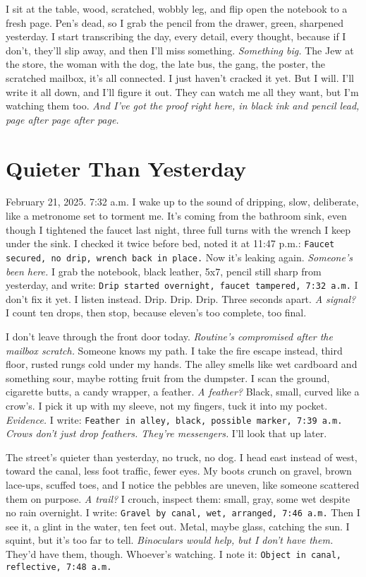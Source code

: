 \documentclass[12pt,oneside]{book} %
\newcommand{\note}[1]{\texttt{#1}}
\begin{document}
I sit at the table, wood, scratched, wobbly leg, and flip open the notebook to a fresh page. Pen’s dead, so I grab the pencil from the drawer, green, sharpened yesterday. I start transcribing the day, every detail, every thought, because if I don’t, they’ll slip away, and then I’ll miss something. \textit{Something big.} The Jew at the store, the woman with the dog, the late bus, the gang, the poster, the scratched mailbox, it’s all connected. I just haven’t cracked it yet. But I will. I’ll write it all down, and I’ll figure it out. They can watch me all they want, but I’m watching them too. \textit{And I’ve got the proof right here, in black ink and pencil lead, page after page after page.}

\chapter{Quieter Than Yesterday}

February 21, 2025. 7:32 a.m. I wake up to the sound of dripping, slow, deliberate, like a metronome set to torment me. It’s coming from the bathroom sink, even though I tightened the faucet last night, three full turns with the wrench I keep under the sink. I checked it twice before bed, noted it at 11:47 p.m.: \note{Faucet secured, no drip, wrench back in place.} Now it’s leaking again. \textit{Someone’s been here.} I grab the notebook, black leather, 5x7, pencil still sharp from yesterday, and write: \note{Drip started overnight, faucet tampered, 7:32 a.m.} I don’t fix it yet. I listen instead. Drip. Drip. Drip. Three seconds apart. \textit{A signal?} I count ten drops, then stop, because eleven’s too complete, too final.

I don’t leave through the front door today. \textit{Routine’s compromised after the mailbox scratch.} Someone knows my path. I take the fire escape instead, third floor, rusted rungs cold under my hands. The alley smells like wet cardboard and something sour, maybe rotting fruit from the dumpster. I scan the ground, cigarette butts, a candy wrapper, a feather. \textit{A feather?} Black, small, curved like a crow’s. I pick it up with my sleeve, not my fingers, tuck it into my pocket. \textit{Evidence.} I write: \note{Feather in alley, black, possible marker, 7:39 a.m.} \textit{Crows don’t just drop feathers. They’re messengers.} I’ll look that up later.

The street’s quieter than yesterday, no truck, no dog. I head east instead of west, toward the canal, less foot traffic, fewer eyes. My boots crunch on gravel, brown lace-ups, scuffed toes, and I notice the pebbles are uneven, like someone scattered them on purpose. \textit{A trail?} I crouch, inspect them: small, gray, some wet despite no rain overnight. I write: \note{Gravel by canal, wet, arranged, 7:46 a.m.} Then I see it, a glint in the water, ten feet out. Metal, maybe glass, catching the sun. I squint, but it’s too far to tell. \textit{Binoculars would help, but I don’t have them.} They’d have them, though. Whoever’s watching. I note it: \note{Object in canal, reflective, 7:48 a.m.}
\end{document}
